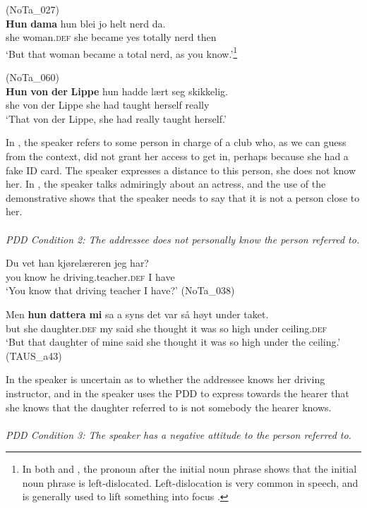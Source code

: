 \documentclass[output=paper,colorlinks,citecolor=brown]{langscibook}
\begin{document}
\ea\label{ex:johannessen:4}
{(NoTa\_027)}\\
\gll \textbf{Hun} \textbf{dama} hun blei jo helt nerd da. \\
     she woman.\textsc{def} she became yes totally nerd then\\
\glt ‘But that woman became a total nerd, as you know.’\footnote{In both  and , the pronoun after the initial noun phrase shows that the initial noun phrase is left-dislocated. Left-dislocation is very common in speech, and is generally used to lift something into focus \citep[904–908]{FaarlundEtAl1997}.}
\z

\ea\label{ex:johannessen:5}
{(NoTa\_060)}\\
\gll \textbf{Hun} \textbf{von} \textbf{der} \textbf{Lippe} hun hadde lært seg skikkelig.\\
     she von der Lippe she had taught herself really\\
\glt ‘That von der Lippe, she had really taught herself.’
\z

In , the speaker refers to some person in charge of a club who, as we can guess from the context, did not grant her access to get in, perhaps because she had a fake ID card. The speaker expresses a distance to this person, she does not know her. In , the speaker talks admiringly about an actress, and the use of the demonstrative shows that the speaker needs to say that it is not a person close to her.\\
\\
\textit{PDD Condition 2: The addressee does not personally know the person referred to.}

\ea\label{ex:johannessen:6}
 \gll Du vet han kjørelæreren jeg har? \\
     you know he driving.teacher.\textsc{def} I have\\
\glt ‘You know that driving teacher I have?’ (NoTa\_038)
\z

\ea\label{ex:johannessen:7}
 \gll Men \textbf{hun} \textbf{dattera} \textbf{mi} sa a syns det var så høyt under taket.\\
     but she daughter.\textsc{def} my said she thought it was so high under ceiling.\textsc{def}\\
\glt ‘But that daughter of mine said she thought it was so high under the ceiling.’ (TAUS\_a43)
\z

In  the speaker is uncertain as to whether the addressee knows her driving instructor, and in  the speaker uses the PDD to express towards the hearer that she knows that the daughter referred to is not somebody the hearer knows.\\
\\
\textit{PDD Condition 3: The speaker has a negative attitude to the person referred to.} 
\end{document}
